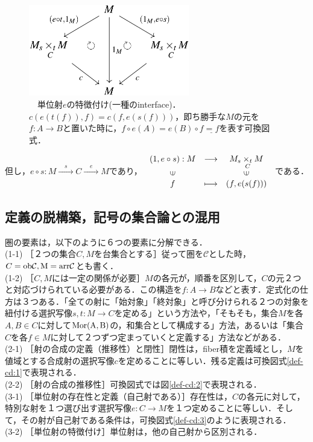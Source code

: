 \documentclass[uplatex, 12pt, a4paper, dvipdfmx]{jsarticle}
\begin{document}
\begin{figure}[ht] \begin{center}  \caption{\label{def-cd:4}　単位射$e$の特徴付け(一種のinterface)．$c(e(t(f)),f)=c(f,e(s(f)))$，即ち勝手な$M$の元を$f:A\longrightarrow B$と置いた時に，$f\circ e(A)=e(B)\circ f\underline{=f}$を表す可換図式．}
    \includegraphics[width=7cm]{cd-4.png}
\end{center}\end{figure}
但し，$e\circ s:M\xrightarrow{\quad s\quad}C\xrightarrow{\quad e \quad}M$であり，
$\begin{array}{ccc}
    (1,e\circ s):M & \longrightarrow & M_s \underset{C}{\times_t}M\\
    \rotatebox{90}{$\in$} & & \rotatebox{90}{$\in$}\\
    f & \longmapsto & (f,e(s(f)))
\end{array}$
である．

\subsection{定義の脱構築，記号の集合論との混用}

圏の要素は，以下のように６つの要素に分解できる．\\
(1-1) \; ［２つの集合$C,M$を台集合とする］従って圏を$\mathcal{C}$とした時，$C=\rm{ob}\mathcal{C}, M=\rm{arr}\mathcal{C}$とも書く．\\
(1-2) \; ［$C,M$には一定の関係が必要］$M$の各元が，順番を区別して，$C$の元２つと対応づけられている必要がある．この構造を$f:A\longrightarrow B$などと表す．定式化の仕方は３つある．「全ての射に「始対象」「終対象」と呼び分けられる２つの対象を紐付ける選択写像$s,t:M\longrightarrow C$を定める」という方法や，「そもそも，集合$M$を各$A,B\in C$に対して$\rm{Mor}(A,B)$の，和集合として構成する」方法，あるいは「集合$C$を各$f\in M$に対して２つずつ定まっていくと定義する」方法などがある．\\
(2-1) \; ［射の合成の定義（推移性）と閉性］閉性は，fiber積を定義域とし，$M$を値域とする合成射の選択写像$c$を定めることに等しい．残る定義は可換図式\ref{def-cd:1}で表現される．\\
(2-2) \; ［射の合成の推移性］可換図式では図\ref{def-cd:2}で表現される．\\
(3-1) \; ［単位射の存在性と定義（自己射である）］存在性は，$C$の各元に対して，特別な射を１つ選び出す選択写像$e:C\longrightarrow M$を１つ定めることに等しい．そして，その射が自己射である条件は，可換図式\ref{def-cd:3}のように表現される．\\
(3-2) \; ［単位射の特徴付け］単位射は，他の自己射から区別される．\par
\end{document}
